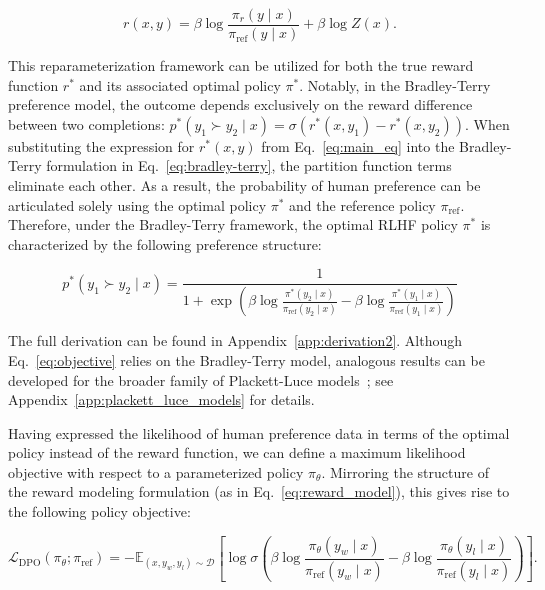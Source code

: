 \begin{equation}\label{eq:main_eq}
    r(x,y) =\beta \log \frac{\pi_r(y\mid x)}{\pi_\text{ref}(y\mid x)} + \beta \log Z(x).
\end{equation}

This reparameterization framework can be utilized for both the true reward function $r^*$ and its associated optimal policy $\pi^*$. Notably, in the Bradley-Terry preference model, the outcome depends exclusively on the reward difference between two completions: ${p^*(y_1 \succ y_2 \mid x) = \sigma(r^*(x, y_1) - r^*(x, y_2))}$. When substituting the expression for $r^*(x,y)$ from Eq.~\ref{eq:main_eq} into the Bradley-Terry formulation in Eq.~\ref{eq:bradley-terry}, the partition function terms eliminate each other. As a result, the probability of human preference can be articulated solely using the optimal policy $\pi^*$ and the reference policy $\pi_\text{ref}$. Therefore, under the Bradley-Terry framework, the optimal RLHF policy $\pi^*$ is characterized by the following preference structure:

\begin{equation}\label{eq:objective}
    p^*(y_1\succ y_2 \mid x)=\frac{1}{1 + \exp\left(\beta \log \frac{\pi^*(y_2\mid x)}{\pi_\text{ref}(y_2\mid x)} - \beta \log \frac{\pi^*(y_1\mid x)}{\pi_\text{ref}(y_1\mid x)}\right)}
\end{equation}

The full derivation can be found in Appendix~\ref{app:derivation2}. Although Eq.~\ref{eq:objective} relies on the Bradley-Terry model, analogous results can be developed for the broader family of Plackett-Luce models~\citep{plackett1975analysis, luce2012individual}; see Appendix~\ref{app:plackett_luce_models} for details.

Having expressed the likelihood of human preference data in terms of the optimal policy instead of the reward function, we can define a maximum likelihood objective with respect to a parameterized policy $\pi_\theta$. Mirroring the structure of the reward modeling formulation (as in Eq.~\ref{eq:reward_model}), this gives rise to the following policy objective:

\begin{equation}\label{eq:optimum_model}
    \mathcal{L}_\text{DPO}(\pi_{\theta}; \pi_\text{ref}) = -\mathbb{E}_{(x, y_w, y_l)\sim \mathcal{D}}\left[\log \sigma \left(\beta \log \frac{\pi_{\theta}(y_w\mid x)}{\pi_\text{ref}(y_w\mid x)} - \beta \log \frac{\pi_{\theta}(y_l\mid x)}{\pi_\text{ref}(y_l\mid x)}\right)\right].
\end{equation}

